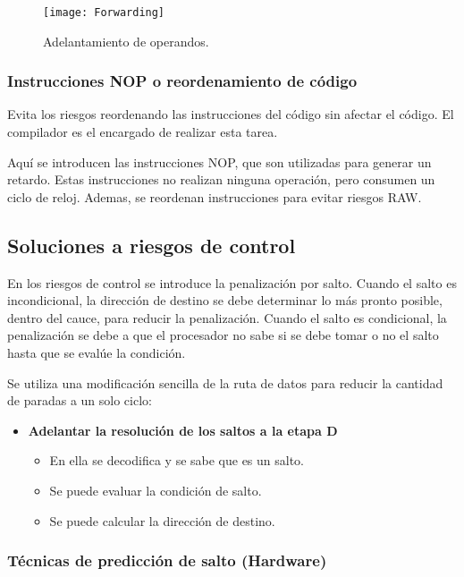 \begin{figure}[H]
  \centering
  \texttt{[image: Forwarding]}
  \caption{Adelantamiento de operandos.} 
\end{figure}

\subsubsection{Instrucciones NOP o reordenamiento de código}

Evita los riesgos reordenando las instrucciones del código sin afectar el código. El compilador es el encargado de realizar esta tarea.

Aquí se introducen las instrucciones NOP, que son utilizadas para generar un retardo. Estas instrucciones no realizan ninguna operación, pero consumen un ciclo de reloj. Ademas, se reordenan instrucciones para evitar riesgos RAW.\@

\subsection{Soluciones a riesgos de control}

En los riesgos de control se introduce la penalización por salto. Cuando el salto es incondicional, la dirección de destino se debe determinar lo más pronto posible, dentro del cauce, para reducir la penalización. Cuando el salto es condicional, la penalización se debe a que el procesador no sabe si se debe tomar o no el salto hasta que se evalúe la condición.

Se utiliza una modificación sencilla de la ruta de datos para reducir la cantidad de paradas a un solo ciclo:

\begin{itemize}
  \item \textbf{Adelantar la resolución de los saltos a la etapa D}
  \begin{itemize}
    \item En ella se decodifica y se sabe que es un salto.
    \item Se puede evaluar la condición de salto.
    \item Se puede calcular la dirección de destino.
  \end{itemize}
\end{itemize}

\subsubsection{Técnicas de predicción de salto (Hardware)}

